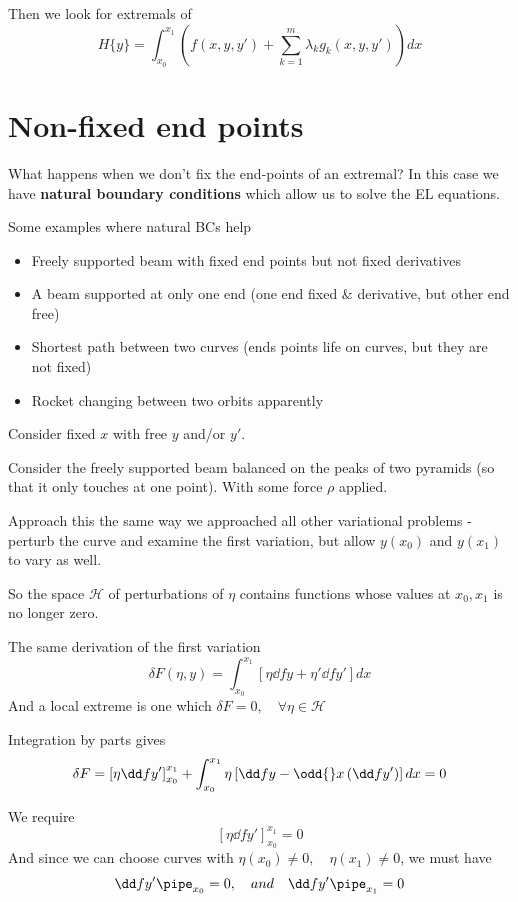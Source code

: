 \documentclass{E:/Documents/Latex/myassignment}
\begin{document}
Then we look for extremals of
\[H\{y\} = \int_{x_0}^{x_1} \left(f(x,y,y') + \sum_{k=1}^m \lambda_k g_k(x,y,y')\right) dx\]


\section{Non-fixed end points}
What happens when we don't fix the end-points of an extremal?
In this case we have \textbf{natural boundary conditions} which allow us to solve the EL equations.

Some examples where natural BCs help
\begin{itemize}
	\item Freely supported beam with fixed end points but not fixed derivatives
	\item A beam supported at only one end (one end fixed \& derivative, but other end free)
	\item Shortest path between two curves (ends points life on curves, but they are not fixed)
	\item Rocket changing between two orbits apparently
\end{itemize}

Consider fixed $x$ with free $y$ and/or $y'$.

Consider the freely supported beam balanced on the peaks of two pyramids (so that it only touches at one point). With some force $\rho$ applied.

Approach this the same way we approached all other variational problems - perturb the curve and examine the first variation, but allow $y(x_0)$ and $y(x_1)$ to vary as well.

So the space $\mathcal{H}$ of perturbations of $\eta$ contains functions whose values at $x_0,x_1$ is no longer zero.

The same derivation of the first variation
\[\delta F(\eta,y) = \int_{x_0}^{x_1} \left[\eta \dd fy + \eta' \dd f{y'}\right] dx \]
And a local extreme is one which $\delta F = 0, \quad \forall \eta \in \mathcal{H}$

Integration by parts gives
\[\delta F = \left[\eta \dd f{y'}\right]_{x_0}^{x_1} + \int_{x_0}^{x_1} \eta \left[\dd fy - \odd{}x \left(\dd f{y'}\right)\right] dx = 0\]

We require 
\[\left[\eta \dd f{y'}\right]_{x_0}^{x_1}  =0\]
And since we can choose curves with $\eta(x_0) \neq 0, \quad \eta(x_1) \neq 0$, we must have
\[\dd f{y'}\pipe_{x_0} = 0, \quad and \quad \dd f{y'}\pipe_{x_1} = 0\]
\end{document}
